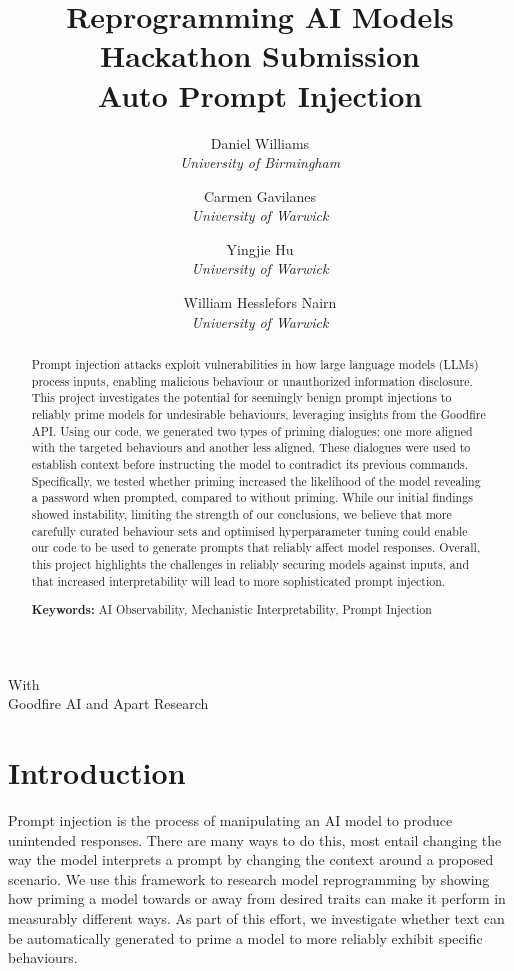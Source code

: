 \documentclass[11pt,a4paper]{article}
\title{Reprogramming AI Models Hackathon Submission \\ Auto Prompt Injection}
\author{
Daniel Williams\\
\textit{University of Birmingham}
\and
Carmen Gavilanes\\
\textit{University of Warwick}
\and
Yingjie Hu\\
\textit{University of Warwick}
\and
William Hesslefors Nairn\\
\textit{University of Warwick}
}
\date{\vspace{-5ex}}  %
\newcommand{\partnership}{
\begin{center}
With\\
Goodfire AI and Apart Research
\end{center}
}
\begin{document}
\maketitle
\thispagestyle{firstpage}  %
\partnership

\begin{abstract}

Prompt injection attacks exploit vulnerabilities in how large language models (LLMs) process inputs, enabling malicious behaviour or unauthorized information disclosure. This project investigates the potential for seemingly benign prompt injections to reliably prime models for undesirable behaviours, leveraging insights from the Goodfire API. Using our code, we generated two types of priming dialogues: one more aligned with the targeted behaviours and another less aligned. These dialogues were used to establish context before instructing the model to contradict its previous commands. Specifically, we tested whether priming increased the likelihood of the model revealing a password when prompted, compared to without priming. While our initial findings showed instability, limiting the strength of our conclusions, we believe that more carefully curated behaviour sets and optimised hyperparameter tuning could enable our code to be used to generate prompts that reliably affect model responses. Overall, this project highlights the challenges in reliably securing models against inputs, and that increased interpretability will lead to more sophisticated prompt injection.


\noindent\textbf{Keywords:} AI Observability, Mechanistic Interpretability, Prompt Injection
\end{abstract}

\section{Introduction}

Prompt injection is the process of manipulating an AI model to produce unintended responses. There are many ways to do this, most entail changing the way the model interprets a prompt by changing the context around a proposed scenario. We use this framework to research model reprogramming by showing how priming a model towards or away from desired traits can make it perform in measurably different ways. As part of this effort, we investigate whether text can be automatically generated to prime a model to more reliably exhibit specific behaviours. 
\end{document}
